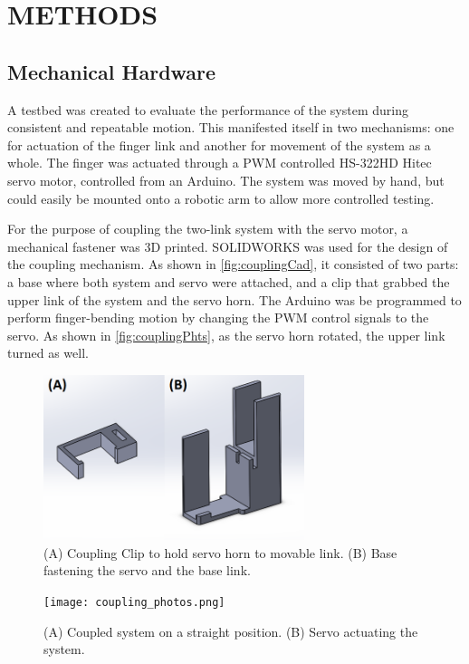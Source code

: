 \documentclass[letterpaper, 10 pt, conference]{ieeeconf}  %
\begin{document}
\section{METHODS}

\subsection{Mechanical Hardware}
A testbed was created to evaluate the performance of the system during consistent and repeatable motion. This manifested itself in two mechanisms: one for actuation of the finger link and another for movement of the system as a whole. The finger was actuated through a PWM controlled HS-322HD Hitec servo motor, controlled from an Arduino. The system was moved by hand, but could easily be mounted onto a robotic arm to allow more controlled testing.

For the purpose of coupling the two-link system with the servo motor, a mechanical fastener was 3D printed. SOLIDWORKS was used for the design of the coupling mechanism. As shown in \autoref{fig:couplingCad}, it consisted of two parts: a base where both system and servo were attached, and a clip that grabbed the upper link of the system and the servo horn. The Arduino was be programmed to perform finger-bending motion by changing the PWM control signals to the servo. As shown in \autoref{fig:couplingPhts}, as the servo horn rotated, the upper link turned as well.

\begin{figure}[thpb]
	\centering
	\includegraphics[width = 3in]{coupling_cads.png}
    \caption{(A) Coupling Clip to hold servo horn to movable link. (B) Base fastening the servo and the base link.}
    \label{fig:couplingCad}
\end{figure}

\begin{figure}[thpb]
	\centering
	\texttt{[image: coupling\_photos.png]}
    \caption{(A) Coupled system on a straight position. (B) Servo actuating the system.}
    \label{fig:couplingPhts}
\end{figure}
\end{document}
